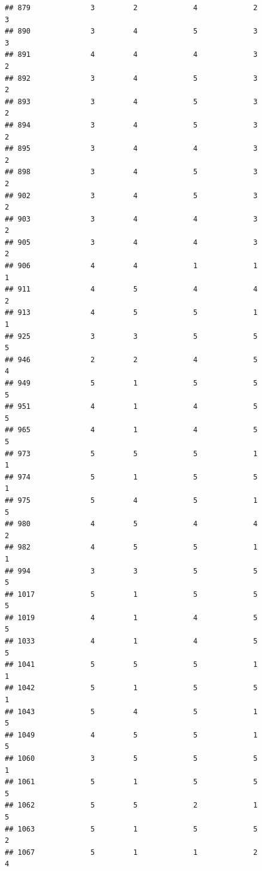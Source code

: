 \documentclass[
]{article}
\begin{document}
\begin{verbatim}
## 879              3         2             4             2           3
## 890              3         4             5             3           3
## 891              4         4             4             3           2
## 892              3         4             5             3           2
## 893              3         4             5             3           2
## 894              3         4             5             3           2
## 895              3         4             4             3           2
## 898              3         4             5             3           2
## 902              3         4             5             3           2
## 903              3         4             4             3           2
## 905              3         4             4             3           2
## 906              4         4             1             1           1
## 911              4         5             4             4           2
## 913              4         5             5             1           1
## 925              3         3             5             5           5
## 946              2         2             4             5           4
## 949              5         1             5             5           5
## 951              4         1             4             5           5
## 965              4         1             4             5           5
## 973              5         5             5             1           1
## 974              5         1             5             5           1
## 975              5         4             5             1           5
## 980              4         5             4             4           2
## 982              4         5             5             1           1
## 994              3         3             5             5           5
## 1017             5         1             5             5           5
## 1019             4         1             4             5           5
## 1033             4         1             4             5           5
## 1041             5         5             5             1           1
## 1042             5         1             5             5           1
## 1043             5         4             5             1           5
## 1049             4         5             5             1           5
## 1060             3         5             5             5           1
## 1061             5         1             5             5           5
## 1062             5         5             2             1           5
## 1063             5         1             5             5           2
## 1067             5         1             1             2           4

\end{verbatim}
\end{document}
